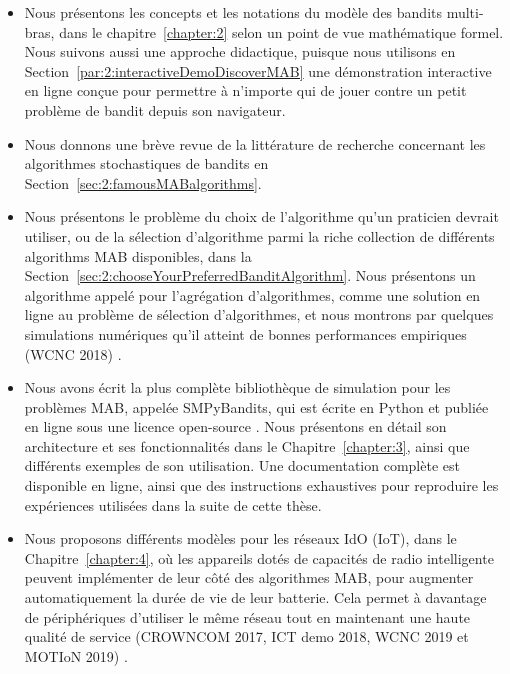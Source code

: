 \begin{resume_fr}
\begin{itemize}
    \item
    Nous présentons les concepts et les notations du modèle des bandits multi-bras, dans le chapitre~\ref{chapter:2} selon un point de vue mathématique formel.
    Nous suivons aussi une approche didactique, puisque nous utilisons en Section~\ref{par:2:interactiveDemoDiscoverMAB} une démonstration interactive en ligne conçue pour permettre à n'importe qui de jouer contre un petit problème de bandit depuis son navigateur.

    \item
    Nous donnons une brève revue de la littérature de recherche concernant les algorithmes stochastiques de bandits en Section~\ref{sec:2:famousMABalgorithms}.

    \item
    Nous présentons le problème du choix de l'algorithme qu'un praticien devrait utiliser, ou de la sélection d'algorithme parmi la riche collection de différents algorithms MAB disponibles, dans la Section~\ref{sec:2:chooseYourPreferredBanditAlgorithm}.
    Nous présentons un algorithme appelé \Aggr{} pour l'agrégation d'algorithmes, comme une solution en ligne au problème de sélection d'algorithmes, et nous montrons par quelques simulations numériques qu'il atteint de bonnes performances empiriques
    (WCNC 2018) \cite{Besson2018WCNC}.

    \item
    Nous avons écrit la plus complète bibliothèque de simulation pour les problèmes MAB, appelée SMPyBandits, qui est écrite en Python et publiée en ligne sous une licence open-source \cite{SMPyBandits,SMPyBanditsJMLR}.
    Nous présentons en détail son architecture et ses fonctionnalités dans le Chapitre~\ref{chapter:3}, ainsi que différents exemples de son utilisation.
    Une documentation complète est disponible en ligne, ainsi que des instructions exhaustives pour reproduire les expériences utilisées dans la suite de cette thèse.

    \item
    Nous proposons différents modèles pour les réseaux IdO (IoT), dans le Chapitre~\ref{chapter:4}, où les appareils dotés de capacités de radio intelligente peuvent implémenter de leur côté des algorithmes MAB, pour augmenter automatiquement la durée de vie de leur batterie. Cela permet à davantage de périphériques d'utiliser le même réseau tout en maintenant une haute qualité de service
    (CROWNCOM 2017, ICT demo 2018, WCNC 2019 et MOTIoN 2019)
    \cite{Bonnefoi17,Besson2019WCNC,Bonnefoi2019WCNC}.


\end{itemize}
\end{resume_fr}
